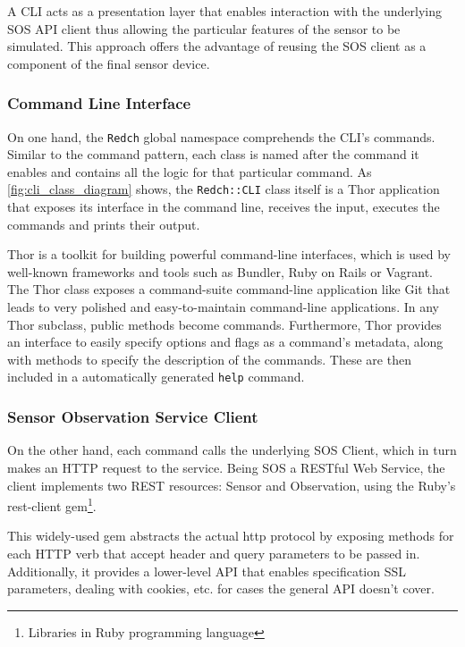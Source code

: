 A CLI acts as a presentation layer that enables interaction with the underlying SOS API client thus allowing the particular features of the sensor to be simulated. This approach offers the advantage of reusing the SOS client as a component of the final sensor device.

\subsubsection*{Command Line Interface}

On one hand, the \texttt{Redch} global namespace comprehends the CLI's commands. Similar to the command pattern, each class is named after the command it enables and contains all the logic for that particular command. As \ref{fig:cli_class_diagram} shows, the \texttt{Redch::CLI} class itself is a Thor application that exposes its interface in the command line, receives the input, executes the commands and prints their output.

Thor is a toolkit for building powerful command-line interfaces, which is used by well-known frameworks and tools such as Bundler, Ruby on Rails or Vagrant. The Thor class exposes a command-suite command-line application like Git that leads to very polished and easy-to-maintain command-line applications. In any Thor subclass, public methods become commands. Furthermore, Thor provides an interface to easily specify options and flags as a command's metadata, along with methods to specify the description of the commands. These are then included in a automatically generated \texttt{help} command.

\subsubsection*{Sensor Observation Service Client}

On the other hand, each command calls the underlying SOS Client, which in turn makes an HTTP request to the service. Being SOS a RESTful Web Service, the client implements two REST resources: Sensor and Observation, using the Ruby's rest-client gem\footnote{Libraries in Ruby programming language}.

This widely-used gem abstracts the actual http protocol by exposing methods for each HTTP verb that accept header and query parameters to be passed in. Additionally, it provides a lower-level API that enables specification SSL parameters, dealing with cookies, etc. for cases the general API doesn't cover.

